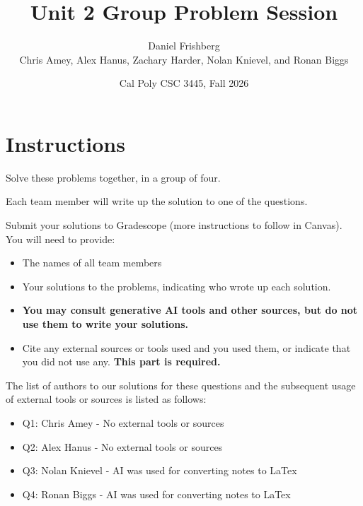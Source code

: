 \documentclass{article}
\title{Unit 2 Group Problem Session}
\author{
    Daniel Frishberg \\
    Chris Amey, Alex Hanus, Zachary Harder, Nolan Knievel, and Ronan Biggs    
}
\date{Cal Poly CSC 3445, Fall 2026}
\theoremstyle{definition}
\newenvironment {solution}
{
\begin{tcolorbox}[breakable]
}
{
\end{tcolorbox}
}
\begin{document}
\lstset{upquote=true}
\setlength\parindent{0em}

\maketitle

\section{Instructions}
Solve these problems together, in a group of four.

Each team member will write up the solution to one of the questions.

Submit your solutions to Gradescope (more instructions to follow in Canvas). You will need to provide:

\begin{itemize}
    \item The names of all team members
    \item Your solutions to the problems, indicating who wrote up each solution.
    \item \textbf{You may consult generative AI tools and other sources, but do not use them to write your solutions.}
    \item Cite any external sources or tools used and you used them, or indicate that you did not use any. \textbf{This part is required.}
\end{itemize}

\vspace{1cm}

\begin{solution}
    The list of authors to our solutions for these questions and the subsequent usage of external tools or sources is listed as follows:
    \begin{itemize}
        \item Q1: Chris Amey - No external tools or sources
        \item Q2: Alex Hanus - No external tools or sources
        \item Q3: Nolan Knievel - AI was used for converting notes to LaTex
        \item Q4: Ronan Biggs - AI was used for converting notes to LaTex
    \end{itemize}
\end{solution}

\pagebreak
\end{document}
